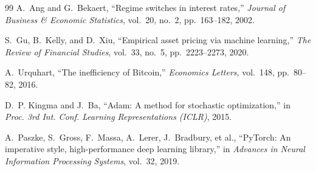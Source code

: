 \documentclass[journal]{IEEEtran}
\begin{document}
\begin{thebibliography}{99}
A.~Ang and G.~Bekaert,
``Regime switches in interest rates,''
\textit{Journal of Business \& Economic Statistics}, vol.~20, no.~2,
pp.~163--182, 2002.

S.~Gu, B.~Kelly, and D.~Xiu,
``Empirical asset pricing via machine learning,''
\textit{The Review of Financial Studies}, vol.~33, no.~5,
pp.~2223--2273, 2020.

A.~Urquhart,
``The inefficiency of Bitcoin,''
\textit{Economics Letters}, vol.~148, pp.~80--82, 2016.

D.~P. Kingma and J.~Ba,
``Adam: A method for stochastic optimization,''
in \textit{Proc. 3rd Int. Conf. Learning Representations (ICLR)}, 2015.

A.~Paszke, S.~Gross, F.~Massa, A.~Lerer, J.~Bradbury, et al.,
``PyTorch: An imperative style, high-performance deep learning library,''
in \textit{Advances in Neural Information Processing Systems}, vol.~32, 2019.

\end{thebibliography}
\end{document}

